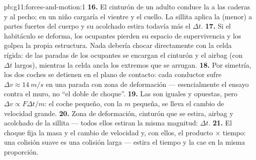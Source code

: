 \begin{solution}{pb:g11:forces-and-motion:1}
\textbf{16.} El cinturón de un adulto conduce la  a las caderas y
al pecho; en un niño cargaría el vientre y el cuello. La sillita aplica
la  (menor) a partes fuertes del cuerpo y su acolchado estira
todavía más el $\Delta t$.
\textbf{17.} Si el habitáculo se deforma, los ocupantes pierden su
espacio de supervivencia y los golpea la propia estructura. Nada debería
chocar directamente con la celda rígida: de las paradas de los ocupantes
se encargan el cinturón y el airbag (con $\Delta t$ largos), mientras la
celda ancla los extremos que se arrugan.
\textbf{18.} Por simetría, los dos coches se detienen en el plano de
contacto: cada conductor sufre $\Delta v \approx \qty{14}{m/s}$ en una
parada con zona de deformación --- esencialmente el ensayo contra el
muro, no ``el doble de choque''.
\textbf{19.} Las  son iguales y opuestas, pero
$\Delta v \propto F\Delta t/m$: el coche pequeño, con la $m$ pequeña, se
lleva el cambio de velocidad grande.
\textbf{20.} Zona de deformación, cinturón que se estira, airbag y
acolchado de la sillita --- todos ellos estiran la misma magnitud:
$\Delta t$.
\textbf{21.} El choque fija la masa y el cambio de velocidad y, con
ellos, el producto  $\times$ tiempo: una colisión suave es una
colisión larga --- estira el tiempo y la  cae en la misma
proporción.
\end{solution}
